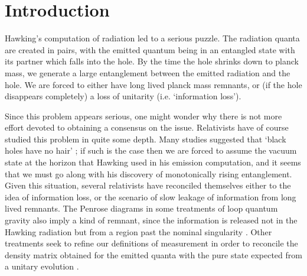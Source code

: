 \documentclass[12pt]{article}
\begin{document}
\let\a=\alpha \let\b=\beta \let\g=\gamma \let\d=\delta \let\e=\epsilon
\let\c=\chi \let\th=\theta  \let\k=\kappa
\let\l=\lambda \let\m=\mu \let\n=\nu \let\x=\xi \let\r=\rho
\let\s=\sigma \let\t=\tau
\let\vp=\varphi \let\vep=\varepsilon
\let\w=\omega      \let\G=\Gamma \let\D=\Delta \let\Th=\Theta
                     \let\P=\Pi \let\S=\Sigma



\def\h{{1\over 2}}
\def\t{\tilde}
\def\r{\rightarrow}
\def\nn{\nonumber\\}
\let\bm=\bibitem
\def\Kt{{\tilde K}}
\def\b{\bigskip}

\let\p=\partial
\def\u{\uparrow}
\def\d{\downarrow}


\newpage
\renewcommand{\theequation}{\arabic{section}.\arabic{equation}}




\def\p{\partial}
\def\r{\rightarrow}
\def\h{{1\over 2}}
\def\b{\bigskip}


\def\nn{\nonumber\\ }



\section{Introduction}
\label{intr}\setcounter{equation}{0}

Hawking's computation of radiation \cite{hawking1,hawking2} led to a serious puzzle. The radiation quanta are created in pairs, with the emitted quantum being in an entangled state with its partner which falls into the hole. By the time the hole shrinks down to planck mass, we generate a large entanglement between the emitted radiation and the hole. We are forced to either have long lived planck mass remnants, or (if the hole disappears completely) a loss of unitarity (i.e. `information loss').


Since this problem appears serious, one might wonder why there is not more effort devoted to obtaining a consensus on the issue. Relativists have of course studied this problem in quite some depth. Many studies suggested that `black holes have no hair' \cite{nohair}; if such is the case then we are forced to assume the vacuum state at the horizon that Hawking used in his emission computation, and it seems that we must go  along with his discovery of monotonically rising entanglement. Given this situation, several relativists have reconciled themselves either to the idea of information loss, or the scenario of slow leakage of information from long lived remnants. The Penrose diagrams in some treatments of loop quantum gravity also imply a kind of remnant, since the information is released not in the Hawking radiation but from a region past the nominal singularity \cite{loops}. Other treatments seek to refine our definitions of measurement in order to reconcile the density matrix obtained for the emitted quanta with the  pure state expected from a unitary evolution \cite{hartle}. 
\end{document}
